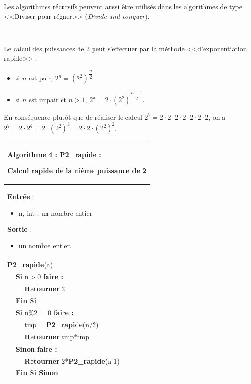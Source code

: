\documentclass[10pt,fleqn]{article} %
\newcommand{\bfsf}[1]{\small\textbf{\textsf{#1}}}%
\begin{document}
Les algorithmes récursifs peuvent aussi être utilisés dans les algorithmes de type <<Diviser pour régner>> (\textit{Divide and conquer}).

\begin{exemple}
$\;$ \\

\begin{minipage}[c]{.45\linewidth}
Le calcul des puissances de 2 peut s'effectuer par la méthode <<d'exponentiation rapide>> :
\begin{itemize}
\item si $n$ est pair, $2^n = \left(2^2\right)^{\dfrac{n}{2}}$;
\item si $n$ est impair et $n>1$, $2^n =2\cdot  \left(2^2\right)^{\dfrac{n-1}{2}}$.
\end{itemize}

En conséquence plutôt que de réaliser le calcul $ 2^7 = 2\cdot 2\cdot 2\cdot 2\cdot 2\cdot 2\cdot 2$, on a $ 2^7 = 2\cdot 2^6 =  2\cdot \left(2^2\right)^3=  2\cdot 2 \cdot \left(2^2\right)^2$. 
\end{minipage}\hfill
\begin{minipage}[c]{.45\linewidth}
\begin{tabular}{p{.5cm}p{.5cm}p{5cm}}
\hline
\multicolumn{3}{p{6cm}}{ \textbf{Algorithme 4 : P2\_rapide} : 

Calcul rapide de la nième puissance de 2} \\
\hline
\multicolumn{3}{p{6cm}}{
\textbf{Entrée} : 
\begin{itemize}
\item n, int  : un nombre entier
\end{itemize}
\textbf{Sortie} : 
\begin{itemize}
\item un nombre entier.
\end{itemize}}\\
\multicolumn{3}{p{6cm}}{\bfsf{P2\_rapide}(n)} \\
& \multicolumn{2}{l}{\bfsf{Si} n$>$0 \bfsf{faire :}}\\
& & \bfsf{Retourner} 2\\
& \multicolumn{2}{l}{\bfsf{Fin Si}}\\
& \multicolumn{2}{l}{\bfsf{Si} n\%2==0 \bfsf{faire :}}\\
&& tmp = \bfsf{P2\_rapide}(n/2) \\
&& \bfsf{Retourner} tmp*tmp\\
& \multicolumn{2}{l}{\bfsf{Sinon} \bfsf{faire :}}\\
&& \bfsf{Retourner} 2*\bfsf{P2\_rapide}(n-1)\\
& \multicolumn{2}{l}{\bfsf{Fin Si Sinon}}\\
\hline
\end{tabular}
\end{minipage}
\end{exemple}
\end{document}
